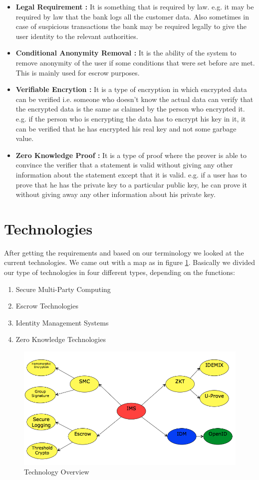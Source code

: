 \begin{itemize}
\item\textbf{Legal Requirement :}
It is something that is required by law. e.g. it may be required by law that the bank logs all the customer data. Also sometimes in case of suspicious transactions the bank may be required legally to give the user identity to the relevant authorities.
\item\textbf{Conditional Anonymity Removal :}
It is the ability of the system to remove anonymity of the user if some conditions that were set before are met. This is mainly used for escrow purposes.
\item\textbf{Verifiable Encrytion{\cite{VE}} :}
It is a type of encryption in which encrypted data can be verified i.e. someone who doesn't know the actual data can verify that the encrypted data is the same as claimed by the person who encrypted it. e.g. if the person who is encrypting the data has to encrypt his key in it, it can be verified that he has encrypted his real key and not some garbage value.
\item\textbf{Zero Knowledge Proof\cite{ZK}\cite{feige1988zero} :}
It is a type of proof where the prover is able to convince the verifier that a statement is valid without giving any other information about the statement except that it is valid. e.g. if a user has to prove that he has the private key to a particular public key, he can prove it without giving away any other information about his private key.
\end{itemize}
\section{Technologies}
After getting the requirements and based on our terminology we looked at the current technologies. We came out with a map as in figure \ref{fig:Technologies}. Basically we divided our type of technologies in four different types, depending on the functions:
\begin{enumerate}
	\item Secure Multi-Party Computing
	\item Escrow Technologies
	\item Identity Management Systems
	\item Zero Knowledge Technologies
\end{enumerate}
\begin{figure}[h]
	\centering
	\includegraphics[width=\textwidth]{figures/Technologies}
	\caption{Technology Overview}
	\label{fig:Technologies}
\end{figure}
